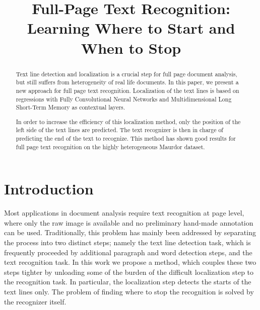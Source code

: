 \documentclass[conference]{IEEEtran}
\begin{document}
\title{Full-Page Text Recognition: \\ Learning Where to Start and When to Stop}





\author{
}











\maketitle

\begin{abstract}

Text line detection and localization is a crucial step for full page document analysis, but still suffers from heterogeneity of real life documents. In this paper, we present a new approach for full page text recognition. Localization of the text lines is based on regressions with Fully Convolutional Neural Networks and Multidimensional Long Short-Term Memory as contextual layers.

In order to increase the efficiency of this localization method, only the position of the left side of the text lines are predicted. The text recognizer is then in charge of predicting the end of the text to recognize. This method has shown good results for full page text recognition on the highly heterogeneous Maurdor dataset.
\end{abstract}





\IEEEpeerreviewmaketitle



\section{Introduction}

Most applications in document analysis require text recognition at page level, where only the raw image is available and no preliminary hand-made annotation can be used. Traditionally, this problem has mainly been addressed by separating the process into two distinct steps; namely the text line detection task, which is frequently proceeded by additional paragraph and word detection steps, and the text recognition task. In this work we propose a method, which couples these two steps tighter by unloading some of the burden of the difficult localization step to the recognition task. In particular, the localization step detects the starts of the text lines only. The problem of finding where to stop the recognition is solved by the recognizer itself.
\end{document}
